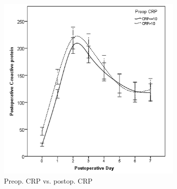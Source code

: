 








\clearpage

\begin{figure}[p]
	\caption{Relationship between preoperative CRP levels and postoperative inflammatory markers in the first week after pancreaticoduodenectomy.}
	\label{fig:sirs_crp}
	\centering
	\begin{subfigure}{0.48\textwidth}
		\centering
		\includegraphics[width=\textwidth]{Figures/sirs_crp_crp}
		\caption{Preop. CRP vs. postop. CRP}
		\label{fig:sirs_crp_crp}
	\end{subfigure}
	\hfill
	\begin{subfigure}{0.48\textwidth}
		\centering

\end{subfigure}
\end{figure}
